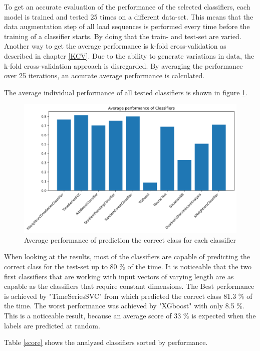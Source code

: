 To get an accurate evaluation of the performance of the selected classifiers, each model is trained and tested 25 times on a different data-set. This means that the data augmentation step of all load sequences is performed every time before the training of a classifier starts.
By doing that the train- and test-set are varied. Another way to get the average performance is k-fold cross-validation as described in chapter \ref{KCV}. Due to the ability to generate variations in data, the k-fold cross-validation approach is disregarded. By averaging the performance over 25 iterations, an accurate average performance is calculated. 

The average individual performance of all tested classifiers is shown in figure \ref{fig:avgperf}.   

\begin{figure}[H]
	\centering
	\includegraphics[width=1\linewidth]{IMGs/Average_performance_CLASS.png}
	\caption{Average performance of prediction the correct class for each classifier}
	\label{fig:avgperf}
\end{figure}

When looking at the results, most of the classifiers are capable of predicting the correct class for the test-set up to 80 \% of the time. 
It is noticeable that the two first classifiers that are working with input vectors of varying length are as capable as the classifiers that require constant dimensions. The Best performance is achieved by "TimeSeriesSVC" from \cite{tslearn} which predicted the correct class 81.3 \% of the time. The worst performance was achieved by "XGboost" with only 8.5 \%. This is a noticeable result, because an average score of 33 \% is expected when the labels are predicted at random.  

Table \ref{score} shows the analyzed classifiers sorted by performance.  

